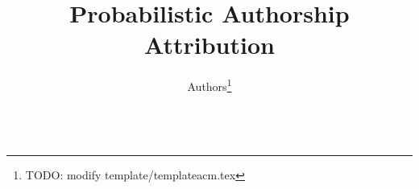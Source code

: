 \documentclass{sig-alternate}
\begin{document}


\title{Probabilistic Authorship Attribution}

\author{
\alignauthor
Authors\thanks{TODO: modify template/templateacm.tex}\\
        \\
}

\maketitle



% 


\end{document}
